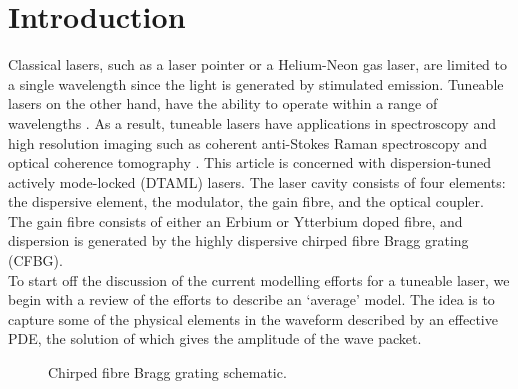 \chapter{Introduction}
Classical lasers, such as a laser pointer or a Helium-Neon gas laser, are limited to a single wavelength since the light is generated by stimulated emission. Tuneable lasers on the other hand, have the ability to operate within a range of wavelengths \cite{bohun, burgoyne2010, yamashita}. As a result, tuneable lasers have applications in spectroscopy and high resolution imaging such as coherent anti-Stokes Raman spectroscopy and optical coherence tomography \cite{bohun, burgoyne2014, yamashita}. This article is concerned with dispersion-tuned actively mode-locked (DTAML) lasers. The laser cavity consists of four elements: the dispersive element, the modulator, the gain fibre, and the optical coupler. The gain fibre consists of either an Erbium or Ytterbium doped fibre, and dispersion is generated by the highly dispersive chirped fibre Bragg grating (CFBG). \\

To start off the discussion of the current modelling efforts for a tuneable laser, we begin with a review of the efforts to describe an `average' model. The idea is to capture some of the physical elements in the waveform described by an effective PDE, the solution of which gives the amplitude of the wave packet.

\begin{figure}[htbp]
\centering

\label{fig:cfbg}
\caption[Chirped Fibre Bragg Grating]{Chirped fibre Bragg grating schematic.}
\end{figure}